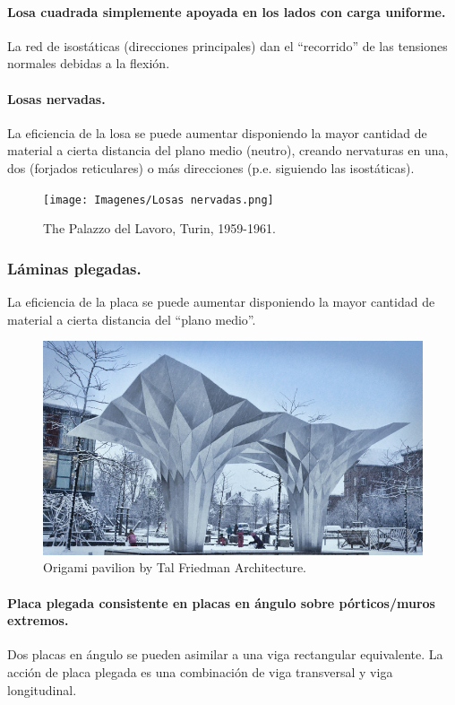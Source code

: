 \paragraph{Losa cuadrada simplemente apoyada en los lados con carga uniforme.}
La red de isostáticas (direcciones principales) dan el ``recorrido'' de las tensiones normales debidas a la flexión.

\paragraph{Losas nervadas.}
La eficiencia de la losa se puede aumentar disponiendo la mayor cantidad de material a cierta distancia del plano medio (neutro), creando nervaturas en una, dos (forjados reticulares) o más direcciones (p.e. siguiendo las isostáticas).

\begin{figure}[h]
    \centering
    \texttt{[image: Imagenes/Losas nervadas.png]}
    \caption{The Palazzo del Lavoro, Turin, 1959-1961.}
\end{figure}

\subsubsection{Láminas plegadas.}
La eficiencia de la placa se puede aumentar disponiendo la mayor cantidad de material a cierta distancia del ``plano medio''.

\begin{figure}[h]
    \centering
    \includegraphics[width=1\linewidth]{Imagenes/Laminas plegadas.png}
    \caption{Origami pavilion by Tal Friedman Architecture.}
\end{figure}

\paragraph{Placa plegada consistente en placas en ángulo sobre pórticos/muros extremos.}
Dos placas en ángulo se pueden asimilar a una viga rectangular equivalente. La acción de placa plegada es una combinación de viga transversal y viga longitudinal.

